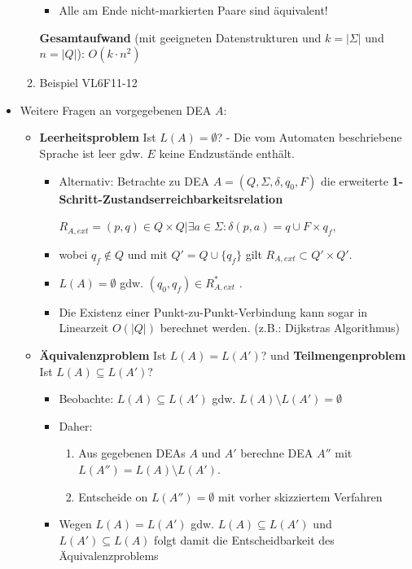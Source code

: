 \documentclass[12pt, a4paper]{article}
\begin{document}
\begin{itemize}
\begin{enumerate}
\begin{itemize}
				\item Alle am Ende nicht-markierten Paare sind äquivalent!
				
				
			\end{itemize}
			\subitem \textbf{Gesamtaufwand} (mit geeigneten Datenstrukturen und $k=|\Sigma|$ und $n=|Q|$): $O(k\cdot n^{2})$
			
			\item Beispiel VL6F11-12
		
		\end{enumerate}
		\item Weitere Fragen an vorgegebenen DEA $A$:
		\begin{itemize}
			\item \textbf{Leerheitsproblem} Ist $L(A)=\emptyset$? - Die vom Automaten beschriebene Sprache ist leer gdw. $E$ keine Endzustände enthält.
			\begin{itemize}
				\item Alternativ: Betrachte zu DEA $A=(Q,\Sigma,\delta,q_{0},F)$ die erweiterte \textbf{1-Schritt-Zustandserreichbarkeitsrelation}
				
				\begin{center}
					$R_{A,ext} = {(p,q)\in Q\times Q|\exists a\in\Sigma:\delta(p,a)=q}\cup F\times{q_{f}}$,
				\end{center}
				
				\item wobei $q_{f}\notin Q$ und mit $Q'=Q\cup\{q_{f}\}$ gilt $R_{A,ext}\subset Q'\times Q'$.
				
				\item $L(A) =\emptyset$ gdw. $(q_{0},q_{f})\in R^{*}_{A,ext}$ .
				
				\item Die Existenz einer Punkt-zu-Punkt-Verbindung kann sogar in Linearzeit $O(|Q|)$
				berechnet werden. (z.B.: Dijkstras Algorithmus)
			\end{itemize}	
				
			
			\item \textbf{Äquivalenzproblem} Ist $L(A)=L(A')$? und \textbf{Teilmengenproblem} Ist $L(A)\subseteq L(A')$? 
			\begin{itemize}
				\item Beobachte: $L(A)\subseteq L(A')$ gdw. $L(A)\setminus L(A')=\emptyset$
				\item Daher:
					\begin{enumerate}
						\item Aus gegebenen DEAs $A$ und $A'$ berechne DEA $A''$ mit $L(A'')=L(A)\setminus L(A')$.
						\item Entscheide on $L(A'')=\emptyset$ mit vorher skizziertem Verfahren
					\end{enumerate}
				\item Wegen $L(A)=L(A')$ gdw. $L(A)\subseteq L(A')$ und $L(A')\subseteq L(A)$ folgt damit die Entscheidbarkeit des Äquivalenzproblems
			\end{itemize}
			

\end{itemize}
\end{itemize}
\end{document}
